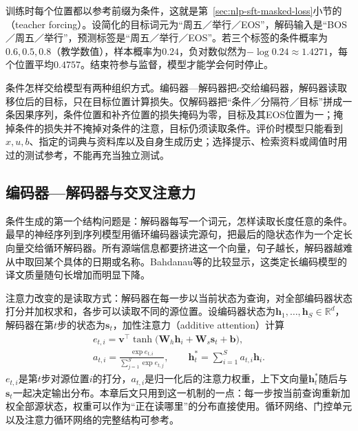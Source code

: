 训练时每个位置都以参考前缀为条件，这就是第~\ref{sec:nlp-sft-masked-loss}小节的（teacher forcing）。设简化的目标词元为“周五／举行／EOS”，解码输入是“BOS／周五／举行”，预测标签是“周五／举行／EOS”。若三个标签的条件概率为$0.6,0.5,0.8$（教学数值），样本概率为$0.24$，负对数似然为$-\log0.24\approx1.4271$，每个位置平均$0.4757$。结束符参与监督，模型才能学会何时停止。

条件怎样交给模型有两种组织方式。编码器—解码器把$c$交给编码器，解码器读取移位后的目标，只在目标位置计算损失。仅解码器把“条件／分隔符／目标”拼成一条因果序列，条件位置和补齐位置的损失掩码为零，目标及其EOS位置为一；掩掉条件的损失并不掩掉对条件的注意，目标仍须读取条件。评价时模型只能看到$x,u,b$、指定的词典与资料库以及自身生成历史；选择提示、检索资料或阈值时用过的测试参考，不能再充当独立测试。

\subsection{编码器—解码器与交叉注意力}
\label{sec:nlp-generation-encoder-decoder}

条件生成的第一个结构问题是：解码器每写一个词元，怎样读取长度任意的条件。最早的神经序列到序列模型用循环编码器读完源句，把最后的隐状态作为一个定长向量交给循环解码器。所有源端信息都要挤进这一个向量，句子越长，解码器越难从中取回某个具体的日期或名称。Bahdanau等的比较显示，这类定长编码模型的译文质量随句长增加而明显下降。

注意力改变的是读取方式：解码器在每一步以当前状态为查询，对全部编码器状态打分并加权求和，各步可以读取不同的源位置。设编码器状态为$\bm h_1,\ldots,\bm h_S\in\mathbb R^{d}$，解码器在第$t$步的状态为$\bm s_t$，加性注意力（additive attention）计算
\begin{equation}
  \begin{gathered}
  e_{t,i}=\bm v^{\top}\tanh\bigl(\bm W_h\bm h_i+\bm W_s\bm s_t+\bm b\bigr),\\
  a_{t,i}=\frac{\exp e_{t,i}}{\sum_{j=1}^{S}\exp e_{t,j}},\qquad
  \bm h^{*}_t=\sum_{i=1}^{S}a_{t,i}\bm h_i .
  \end{gathered}
  \label{eq:nlp-generation-bahdanau}
\end{equation}
$e_{t,i}$是第$t$步对源位置$i$的打分，$a_{t,i}$是归一化后的注意力权重，上下文向量$\bm h^{*}_t$随后与$\bm s_t$一起决定输出分布。本章后文只用到这一机制的一点：每一步按当前查询重新加权全部源状态，权重可以作为“正在读哪里”的分布直接使用。循环网络、门控单元以及注意力循环网络的完整结构可参考。


